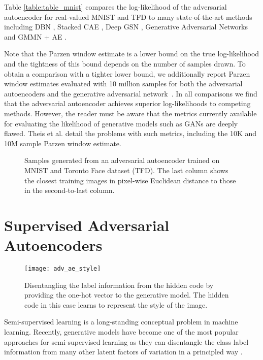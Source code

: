 \documentclass{article}
\begin{document}
Table \ref{table:table_mnist} compares the log-likelihood of the adversarial autoencoder for real-valued MNIST and TFD to many state-of-the-art methods including DBN \citep{geoff}, Stacked CAE \citep{stacked_cae}, Deep GSN \citep{gsn}, Generative Adversarial Networks \citep{gan} and GMMN + AE \citep{gmmn}.

Note that the Parzen window estimate is a lower bound on the true log-likelihood and the tightness of this bound depends on the number of samples drawn.
To obtain a comparison with a tighter lower bound, we additionally report Parzen window estimates evaluated with 10 million samples for both the adversarial autoencoders and the generative adversarial network~\citep{gan}.
In all comparisons we find that the adversarial autoencoder achieves superior log-likelihoods to competing methods.
However, the reader must be aware that the metrics currently available for evaluating the likelihood of generative models such as GANs are deeply flawed. 
Theis et al. \citep{theis} detail the problems with such metrics, including the 10K and 10M sample Parzen window estimate.

\begin{figure}[b]
\centering
{}
\hspace{.2cm}
\caption{\label{fig_samples}Samples generated from an adversarial autoencoder trained on MNIST and Toronto Face dataset (TFD). The last column shows the closest training images in pixel-wise Euclidean distance to those in the second-to-last column.}
\end{figure}


\section{Supervised Adversarial Autoencoders}\label{sec:supervised}
\begin{figure}[t]
\begin{center}
\centering 
\hspace{0.2cm}\texttt{[image: adv\_ae\_style]}
\caption{\label{fig_semi_adv}Disentangling the label information from the hidden code by providing the one-hot vector to the generative model. The hidden code in this case learns to represent the style of the image.}
\end{center}
\end{figure}
Semi-supervised learning is a long-standing conceptual problem in machine learning. Recently, generative models have become one of the most popular approaches for semi-supervised learning as they can disentangle the class label information from many other latent factors of variation in a principled way \citep{semi-vae,adgm}. 
\end{document}
